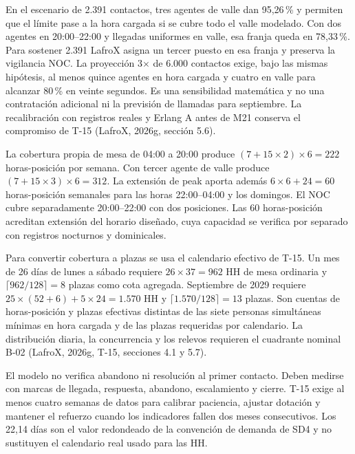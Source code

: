 En el escenario de 2.391 contactos, tres agentes de valle dan 95,26\,\% y permiten que el límite pase a la hora cargada si se cubre todo el valle modelado. Con dos agentes en 20:00--22:00 y llegadas uniformes en valle, esa franja queda en 78,33\,\%. Para sostener 2.391 LafroX asigna un tercer puesto en esa franja y preserva la vigilancia NOC. La proyección 3$\times$ de 6.000 contactos exige, bajo las mismas hipótesis, al menos quince agentes en hora cargada y cuatro en valle para alcanzar 80\,\% en veinte segundos. Es una sensibilidad matemática y no una contratación adicional ni la previsión de llamadas para septiembre. La recalibración con registros reales y Erlang A antes de M21 conserva el compromiso de T-15 (LafroX, 2026g, sección 5.6).

La cobertura propia de mesa de 04:00 a 20:00 produce $(7+15\times2)\times6=222$ horas-posición por semana. Con tercer agente de valle produce $(7+15\times3)\times6=312$. La extensión de peak aporta además $6\times6+24=60$ horas-posición semanales para las horas 22:00--04:00 y los domingos. El NOC cubre separadamente 20:00--22:00 con dos posiciones. Las 60 horas-posición acreditan extensión del horario diseñado, cuya capacidad se verifica por separado con registros nocturnos y dominicales.

Para convertir cobertura a plazas se usa el calendario efectivo de T-15. Un mes de 26 días de lunes a sábado requiere $26\times37=962$ HH de mesa ordinaria y $\lceil962/128\rceil=8$ plazas como cota agregada. Septiembre de 2029 requiere $25\times(52+6)+5\times24=\text{1.570}$ HH y $\lceil\text{1.570}/128\rceil=13$ plazas. Son cuentas de horas-posición y plazas efectivas distintas de las siete personas simultáneas mínimas en hora cargada y de las plazas requeridas por calendario. La distribución diaria, la concurrencia y los relevos requieren el cuadrante nominal B-02 (LafroX, 2026g, T-15, secciones 4.1 y 5.7).

El modelo no verifica abandono ni resolución al primer contacto. Deben medirse con marcas de llegada, respuesta, abandono, escalamiento y cierre. T-15 exige al menos cuatro semanas de datos para calibrar paciencia, ajustar dotación y mantener el refuerzo cuando los indicadores fallen dos meses consecutivos. Los 22,14 días son el valor redondeado de la convención de demanda de SD4 y no sustituyen el calendario real usado para las HH.

